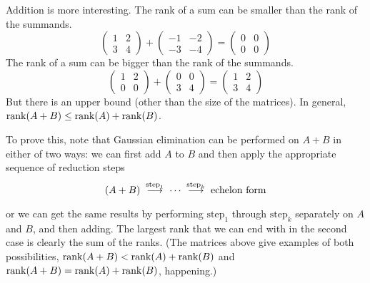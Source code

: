 \begin{exercises}
\begin{answer}
      Addition is more interesting.
      The rank of a sum can be smaller than the rank of the summands.
      \begin{equation*}
        \begin{pmatrix}
          1  &2  \\
          3  &4
        \end{pmatrix}
        +
        \begin{pmatrix}
         -1  &-2  \\
         -3  &-4
        \end{pmatrix}
        =
        \begin{pmatrix}
         0   &0   \\
         0   &0
        \end{pmatrix}
      \end{equation*}
      The rank of a sum can be bigger than the rank of the summands.
      \begin{equation*}
        \begin{pmatrix}
          1  &2  \\
          0  &0
        \end{pmatrix}
        +
        \begin{pmatrix}
          0  &0   \\
          3  &4
        \end{pmatrix}
        =
        \begin{pmatrix}
         1   &2   \\
         3   &4
        \end{pmatrix}
      \end{equation*}
      But there is an upper bound (other than the size of the matrices).
      In general, \( \operatorname{rank}(A+B)\leq\operatorname{rank}(A)+\operatorname{rank}(B) \).

      To prove this, note that Gaussian elimination can be performed on
      \( A+B \) in either of two ways:
      we can first add \( A \) to \( B \) and then apply the appropriate
      sequence of reduction steps
      \begin{equation*}
        (A+B)
        \;\mathrel{ \mathop{\longrightarrow}\limits^{\text{step}_1\mathstrut}_{ \begin{subarray}{l} \relax \end{subarray}}}
        \;\cdots
        \;\mathrel{ \mathop{\longrightarrow}\limits^{\text{step}_k\mathstrut}_{ \begin{subarray}{l} \relax \end{subarray}}}
        \;\text{echelon form}
      \end{equation*}
      or we can get the same results by performing \( \text{step}_1 \) through
      \( \text{step}_k \) separately on \( A \) and \( B \), and then adding.
      The largest rank that we can end with in the second case is clearly 
      the sum of the ranks.
      (The matrices above give examples of both possibilities,  
       $\operatorname{rank}(A+B)<\operatorname{rank}(A)+\operatorname{rank}(B)$ and $\operatorname{rank}(A+B)=\operatorname{rank}(A)+\operatorname{rank}(B)$,
       happening.)
    \end{answer}
\end{exercises}
